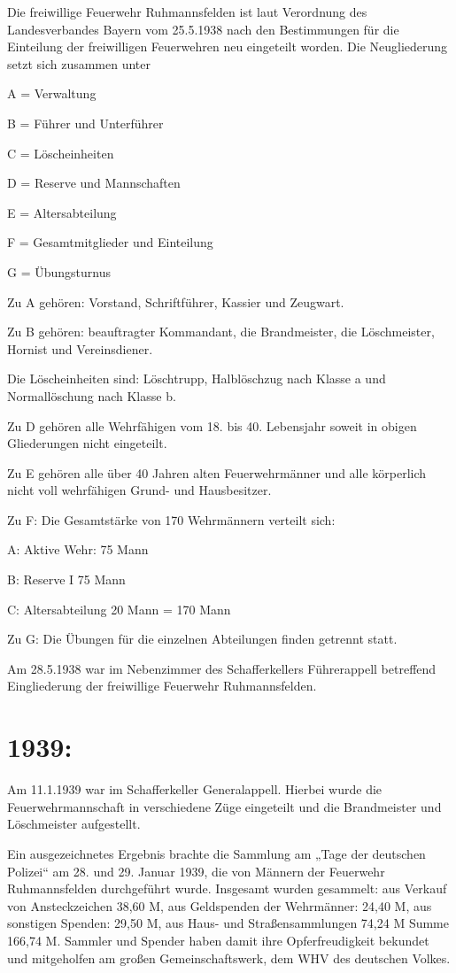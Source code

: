 \documentclass[12pt,a4paper]{book}
\begin{document}
Die freiwillige Feuerwehr Ruhmannsfelden ist laut Verordnung des Landesverbandes
Bayern vom 25.5.1938 nach den Bestimmungen für die Einteilung der freiwilligen
Feuerwehren neu eingeteilt worden. Die Neugliederung setzt sich zusammen unter

A = Verwaltung

B = Führer und Unterführer

C = Löscheinheiten

D = Reserve und Mannschaften

E = Altersabteilung

F = Gesamtmitglieder und Einteilung

G = Übungsturnus

Zu A gehören: Vorstand, Schriftführer, Kassier und Zeugwart.

Zu B gehören: beauftragter Kommandant, die Brandmeister, die Löschmeister,
Hornist und Vereinsdiener.

Die Löscheinheiten sind: Löschtrupp, Halblöschzug nach Klasse a und
Normallöschung nach Klasse b.

Zu D gehören alle Wehrfähigen vom 18. bis 40. Lebensjahr soweit in obigen
Gliederungen nicht eingeteilt.

Zu E gehören alle über 40 Jahren alten Feuerwehrmänner und alle körperlich nicht
voll wehrfähigen Grund- und Hausbesitzer.

Zu F: Die Gesamtstärke von 170 Wehrmännern verteilt sich:

A: Aktive Wehr: 75 Mann

B: Reserve I 75 Mann

C: Altersabteilung 20 Mann = 170 Mann

Zu G: Die Übungen für die einzelnen Abteilungen finden getrennt statt.

Am 28.5.1938 war im Nebenzimmer des Schafferkellers Führerappell betreffend
Eingliederung der freiwillige Feuerwehr Ruhmannsfelden.

\section{1939:}

Am 11.1.1939 war im Schafferkeller Generalappell. Hierbei wurde die
Feuerwehrmannschaft in verschiedene Züge eingeteilt und die Brandmeister und
Löschmeister aufgestellt.

Ein ausgezeichnetes Ergebnis brachte die Sammlung am „Tage der deutschen
Polizei“ am 28. und 29. Januar 1939, die von Männern der Feuerwehr
Ruhmannsfelden durchgeführt wurde. Insgesamt wurden gesammelt: aus Verkauf von
Ansteckzeichen 38,60 M, aus Geldspenden der Wehrmänner: 24,40 M, aus sonstigen
Spenden: 29,50 M, aus Haus- und Straßensammlungen 74,24 M Summe 166,74 M.
Sammler und Spender haben damit ihre Opferfreudigkeit bekundet und mitgeholfen
am großen Gemeinschaftswerk, dem WHV des deutschen Volkes.
\end{document}
